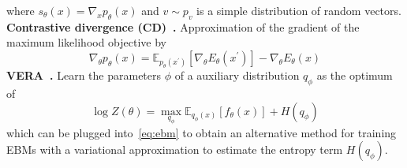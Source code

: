 \documentclass[landscape,a0paper,fontscale=0.292]{baposter}
\begin{document}
\begin{poster}
{    where \(s_\theta(x) = \nabla_x p_\theta(x)\) and \(v \sim p_v\) is a simple distribution of random vectors. \\
    \textbf{Contrastive divergence (CD)~\cite{hintonTrainingProductsExperts2002}.}
    Approximation of the gradient of the maximum likelihood objective by
    \begin{equation}
    \label{eq:cd}
        \nabla_\theta p_\theta(x) = \mathbb{E}_{p_\theta(x^\prime)} \left[ \nabla_\theta E_\theta(x^\prime) \right] - \nabla_\theta E_\theta(x) \nonumber
    \end{equation}
    \textbf{VERA~\cite{grathwohlNoMCMCMe2020}.}
    Learn the parameters \(\phi \) of a auxiliary distribution \(q_\phi \) as the optimum of
    \begin{equation}
        \log Z(\theta) = \max_{q_\phi} \mathbb{E}_{q_\phi(x)} \left[ f_\theta(x) \right] + H(q_\phi) \nonumber
    \end{equation}
    which can be plugged into~\ref{eq:ebm} to obtain an alternative method for training EBMs with a variational approximation to estimate the entropy term \(H(q_\phi)\).\\
}



\end{poster}
\end{document}
